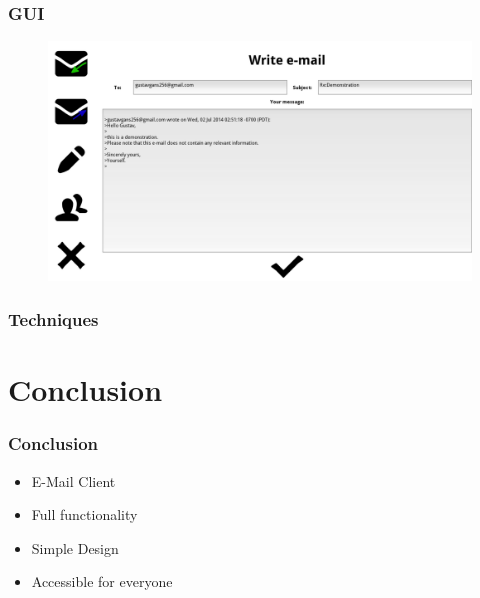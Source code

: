 \documentclass[9pt]{beamer}
\begin{document}
		    	\begin{frame}
				\frametitle{GUI}
				\begin{figure}
					\centering
					\includegraphics[scale=0.2]{Images/Answer.png}
				\end{figure}
		    	\end{frame}
			\begin{frame}
				\frametitle{Techniques}
				
		    	\end{frame}
		    	
	
	\section{Conclusion}
		\begin{frame}
			\frametitle{Conclusion}
			\begin{itemize}
				\item E-Mail Client
				\item Full functionality
				\item Simple Design
				\item Accessible for everyone
			\end{itemize}
			
		\end{frame}
\end{document}
